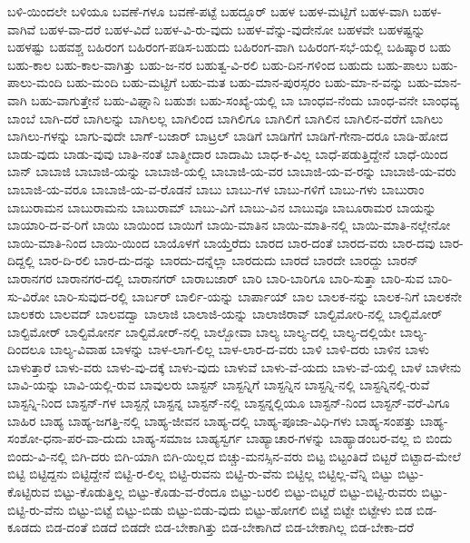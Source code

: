 {ಬಳಿ-ಯಿಂದಲೇ
ಬಳಿಯೂ
ಬವಣೆ-ಗಳೂ
ಬವಣೆ-ಪಟ್ಟೆ
ಬಹದ್ದೂರ್
ಬಹಳ
ಬಹಳ-ಮಟ್ಟಿಗೆ
ಬಹಳ-ವಾಗಿ
ಬಹಳ-ವಾಗಿವೆ
ಬಹಳ-ವಾ-ದರೆ
ಬಹಳ-ವಿದೆ
ಬಹಳ-ವಿ-ರು-ವುದು
ಬಹಳ-ವೆನ್ನು-ವುದೇನೋ
ಬಹಳವೇ
ಬಹಳಷ್ಟನ್ನು
ಬಹಳಷ್ಟು
ಬಹವಶ್ಚ
ಬಹಿರಂಗ
ಬಹಿರಂಗ-ಪಡಿಸ-ಬಹುದು
ಬಹಿರಂಗ-ವಾಗಿ
ಬಹಿರಂಗ-ಸಭೆ-ಯಲ್ಲಿ
ಬಹಿಷ್ಕಾರ
ಬಹು
ಬಹು-ಕಾಲ
ಬಹು-ಕಾಲ-ವಾಗಿತ್ತು
ಬಹು-ಜ-ನರ
ಬಹುತ್ವ-ವಿ-ರಲಿ
ಬಹು-ದಿನ-ಗಳಿಂದ
ಬಹುದು
ಬಹು-ಪಾಲು
ಬಹು-ಪಾಲು-ಮಂದಿ
ಬಹು-ಮಂದಿ
ಬಹು-ಮಟ್ಟಿಗೆ
ಬಹು-ಮತ
ಬಹು-ಮಾನ-ಪುರಸ್ಸರಂ
ಬಹು-ಮಾ-ನ-ವನ್ನು
ಬಹು-ಮಾನ-ವಾಗಿ
ಬಹು-ವಾಗುತ್ತೇನೆ
ಬಹು-ವಿಘ್ನಾನಿ
ಬಹುಶಃ
ಬಹು-ಸಂಖ್ಯೆ-ಯಲ್ಲಿ
ಬಾ
ಬಾಂಧವ-ನೆಂದು
ಬಾಂಧ-ವನೇ
ಬಾಂಧವ್ಯ
ಬಾಂಬೆ
ಬಾಗಿ-ದರೆ
ಬಾಗಿಲನ್ನು
ಬಾಗಿಲಲ್ಲ
ಬಾಗಿಲಿಂದ
ಬಾಗಿಲಿಗೂ
ಬಾಗಿಲಿಗೆ
ಬಾಗಿಲಿನ
ಬಾಗಿಲಿನ-ವರೆಗೆ
ಬಾಗಿಲು
ಬಾಗಿಲು-ಗಳನ್ನು
ಬಾಗು-ವುದೇ
ಬಾಗ್-ಬಜಾರ್
ಬಾಟ್ರಲ್
ಬಾಡಿಗೆ
ಬಾಡಿಗೆಗೆ
ಬಾಡಿಗೆ-ಗೇನಾ-ದರೂ
ಬಾಡಿ-ಹೋದ
ಬಾಡು-ವುದು
ಬಾಡು-ವುವು
ಬಾತಿ-ನಂತೆ
ಬಾತ್ಮೀದಾರ
ಬಾದಾಮಿ
ಬಾಧ-ಕ-ವಿಲ್ಲ
ಬಾಧೆ-ಪಡುತ್ತಿದ್ದೇನೆ
ಬಾಧೆ-ಯಿಂದ
ಬಾನ್
ಬಾಬಾಜಿ
ಬಾಬಾಜಿ-ಯನ್ನು
ಬಾಬಾಜಿ-ಯಲ್ಲಿ
ಬಾಬಾಜಿ-ಯ-ವರ
ಬಾಬಾಜಿ-ಯ-ವ-ರನ್ನು
ಬಾಬಾಜಿ-ಯ-ವರು
ಬಾಬಾಜಿ-ಯ-ವರೂ
ಬಾಬಾಜಿ-ಯ-ವ-ರೊಡನೆ
ಬಾಬು
ಬಾಬು-ಗಳ
ಬಾಬು-ಗಳಿಗೆ
ಬಾಬು-ಗಳು
ಬಾಬುರಾಂ
ಬಾಬುರಾಮನ
ಬಾಬುರಾಮನು
ಬಾಬುರಾಮ್
ಬಾಬು-ವಿಗೆ
ಬಾಬು-ವಿನ
ಬಾಬುವೂ
ಬಾಬೂರಾಮರ
ಬಾಯನ್ನು
ಬಾಯಾರಿ-ದ-ವ-ರಿಗೆ
ಬಾಯಿ
ಬಾಯಿಂದ
ಬಾಯಿಗೆ
ಬಾಯಿ-ಮಾತಿನ
ಬಾಯಿ-ಮಾತಿ-ನಲ್ಲಿ
ಬಾಯಿ-ಮಾತಿ-ನಲ್ಲೇನೋ
ಬಾಯಿ-ಮಾತಿ-ನಿಂದ
ಬಾಯಿ-ಯಿಂದ
ಬಾಯೊಳಗೆ
ಬಾಯ್ತೆರೆದು
ಬಾರದ
ಬಾರ-ದಂತೆ
ಬಾರದ-ವರು
ಬಾರ-ದವು
ಬಾರ-ದಿದ್ದಲ್ಲಿ
ಬಾರ-ದಿ-ರಲಿ
ಬಾರ-ದು-ದನ್ನು
ಬಾರದು-ದನ್ನೆಲ್ಲಾ
ಬಾರದುದು
ಬಾರದೆ
ಬಾರದೇ
ಬಾರದ್ದು
ಬಾರನ್
ಬಾರಾನಗರ
ಬಾರಾನಗರ-ದಲ್ಲಿ
ಬಾರಾನಗರ್
ಬಾರಾಬಜಾರ್
ಬಾರಿ
ಬಾರಿ-ಬಾರಿಗೂ
ಬಾರಿ-ಸುತ್ತಾ
ಬಾರಿ-ಸುವ
ಬಾರಿ-ಸು-ವಿರೋ
ಬಾರಿ-ಸುವುದ-ರಲ್ಲಿ
ಬಾರ್ಬರ್
ಬಾರ್ಲಿ-ಯನ್ನು
ಬಾರ್ಪಾಯ್
ಬಾಲ
ಬಾಲಕ-ನನ್ನು
ಬಾಲಕ-ನಿಗೆ
ಬಾಲಕನೇ
ಬಾಲಕರು
ಬಾಲವದ್
ಬಾಲವದ್ವಾ
ಬಾಲಾಜಿ
ಬಾಲಾಜಿ-ಯನ್ನು
ಬಾಲಾಜಿರಾವ್
ಬಾಲ್ಟಿಮೋರಿ-ನಲ್ಲಿ
ಬಾಲ್ಟಿಮೋರ್
ಬಾಲ್ಟಿಮೋರ್
ಬಾಲ್ಟಿಮೋರ್ನ
ಬಾಲ್ಟಿಮೋರ್-ನಲ್ಲಿ
ಬಾಲ್ಬೋವಾ
ಬಾಲ್ಯ
ಬಾಲ್ಯ-ದಲ್ಲಿ
ಬಾಲ್ಯ-ದಲ್ಲಿಯೇ
ಬಾಲ್ಯ-ದಿಂದಲೂ
ಬಾಲ್ಯ-ವಿವಾಹ
ಬಾಳನ್ನು
ಬಾಳ-ಲಾಗ-ಲಿಲ್ಲ
ಬಾಳ-ಲಾರ-ದ-ವರು
ಬಾಳಿ
ಬಾಳಿ-ದರು
ಬಾಳಿನ
ಬಾಳು
ಬಾಳುತ್ತಾರೆ
ಬಾಳು-ವರು
ಬಾಳು-ವು-ದಕ್ಕೆ
ಬಾಳು-ವುದು
ಬಾಳುವೆ
ಬಾಳು-ವೆ-ಯದು
ಬಾಳು-ವೆ-ಯಲ್ಲಿ
ಬಾಳೆ
ಬಾಳೇನು
ಬಾವಿ-ಯನ್ನು
ಬಾವಿ-ಯಲ್ಲಿ-ರುವ
ಬಾವುಲರು
ಬಾಸ್ಟನ್
ಬಾಸ್ಟನ್ನಿಗೆ
ಬಾಸ್ಟನ್ನಿನ
ಬಾಸ್ಟನ್ನಿ-ನಲ್ಲಿ
ಬಾಸ್ಟನ್ನಿನಲ್ಲಿ-ರುವೆ
ಬಾಸ್ಟನ್ನಿ-ನಿಂದ
ಬಾಸ್ಟನ್-ಗಳ
ಬಾಸ್ಟನ್ಗೆ
ಬಾಸ್ಟನ್ನ
ಬಾಸ್ಟನ್-ನಲ್ಲಿ
ಬಾಸ್ಟನ್ನಲ್ಲಿಯೂ
ಬಾಸ್ಟನ್-ನಿಂದ
ಬಾಸ್ಟನ್-ವರೆ-ವಿಗೂ
ಬಾಹಿರ
ಬಾಹ್ಯ
ಬಾಹ್ಯ-ಜಗತ್ತಿ-ನಲ್ಲಿ
ಬಾಹ್ಯ-ಜೀವನ
ಬಾಹ್ಯ-ದಲ್ಲಿ
ಬಾಹ್ಯ-ಪೂಜಾ-ವಿಧಿ-ಗಳು
ಬಾಹ್ಯ-ಸಂಪತ್ತು
ಬಾಹ್ಯ-ಸಂಶೋ-ಧನಾ-ಪರ-ವಾ-ದುದು
ಬಾಹ್ಯ-ಸಮಾಜ
ಬಾಹ್ಯಸ್ವರ್ಗ
ಬಾಹ್ಯಾಚಾರ-ಗಳನ್ನು
ಬಾಹ್ಯಾಡಂಬರ-ವಲ್ಲ
ಬಿ
ಬಿಂದು
ಬಿಂದು-ವಿ-ನಲ್ಲಿ
ಬಿಗಿ-ದರು
ಬಿಗಿ-ಯಾಗಿ
ಬಿಗಿ-ಯಿಲ್ಲದ
ಬಿಚ್ಚು-ಮನಸ್ಸಿನ-ವರು
ಬಿಟ್ಟ
ಬಿಟ್ಟಂತಿದೆ
ಬಿಟ್ಟರೆ
ಬಿಟ್ಟಾದ-ಮೇಲೆ
ಬಿಟ್ಟಿ
ಬಿಟ್ಟಿದ್ದನು
ಬಿಟ್ಟಿದ್ದೇನೆ
ಬಿಟ್ಟಿ-ರ-ಲಿಲ್ಲ
ಬಿಟ್ಟಿ-ರುವನು
ಬಿಟ್ಟಿ-ರು-ವೆನು
ಬಿಟ್ಟಿಲ್ಲ
ಬಿಟ್ಟಿಲ್ಲ-ವೆನ್ನಿ
ಬಿಟ್ಟು
ಬಿಟ್ಟು-ಕೊಟ್ಟಿರುವ
ಬಿಟ್ಟು-ಕೊಡುತ್ತಿಲ್ಲ
ಬಿಟ್ಟು-ಕೊಡು-ವ-ರೆಂದೂ
ಬಿಟ್ಟು-ಬರಲಿ
ಬಿಟ್ಟು-ಬಿಟ್ಟರೆ
ಬಿಟ್ಟು-ಬಿಟ್ಟಿ-ರುವರು
ಬಿಟ್ಟು-ಬಿಟ್ಟಿ-ರು-ವೆನು
ಬಿಟ್ಟು-ಬಿಟ್ಟೆ
ಬಿಟ್ಟು-ಬಿಡು
ಬಿಟ್ಟು-ಬಿಡು-ವುದು
ಬಿಟ್ಟು-ಹೋಗಲಿ
ಬಿಟ್ಟೆ
ಬಿಟ್ಟೇ
ಬಿಟ್ಟೇಳು
ಬಿಡ
ಬಿಡ-ಕೂಡದು
ಬಿಡ-ದಂತೆ
ಬಿಡದೆ
ಬಿಡದೇ
ಬಿಡ-ಬೇಕಾಗಿತ್ತು
ಬಿಡ-ಬೇಕಾಗಿದೆ
ಬಿಡ-ಬೇಕಾಗಿಲ್ಲ
ಬಿಡ-ಬೇಕಾ-ದರೆ
}

